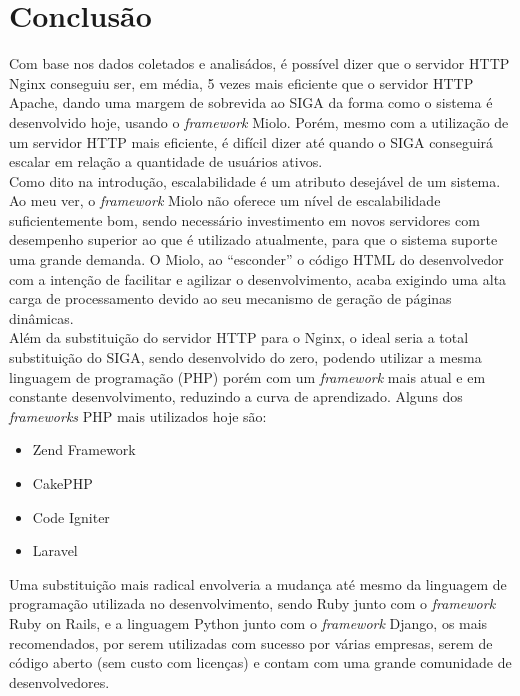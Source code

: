\chapter{Conclusão}\label{cap:conclusao}
Com base nos dados coletados e analisádos, é possível dizer que o servidor HTTP 
Nginx conseguiu ser, em média, 5 vezes mais eficiente que o servidor HTTP 
Apache, dando uma margem de sobrevida ao SIGA da forma como o sistema é 
desenvolvido hoje, usando o \textit{framework} Miolo. Porém, mesmo com a 
utilização de um servidor HTTP mais eficiente, é difícil dizer até quando o 
SIGA conseguirá escalar em relação a quantidade de usuários ativos.\\
Como dito na introdução, escalabilidade é um atributo desejável de um sistema. 
Ao meu ver, o \textit{framework} Miolo não oferece um nível de escalabilidade 
suficientemente bom, sendo necessário investimento em novos servidores com 
desempenho superior ao que é utilizado atualmente, para que o sistema suporte 
uma grande demanda. O Miolo, ao ``esconder'' o código HTML do desenvolvedor com 
a intenção de facilitar e agilizar o desenvolvimento, acaba exigindo uma alta 
carga de processamento devido ao seu mecanismo de geração de páginas 
dinâmicas.\\
Além da substituição do servidor HTTP para o Nginx, o ideal seria a total 
substituição do SIGA, sendo desenvolvido do zero, podendo utilizar a mesma 
linguagem de programação (PHP) porém com um \textit{framework} mais atual e em 
constante desenvolvimento, reduzindo a curva de aprendizado. Alguns dos  
\textit{frameworks} PHP mais utilizados hoje são:
\begin{itemize}
	\item Zend Framework
	\item CakePHP
	\item Code Igniter
	\item Laravel
\end{itemize}
Uma substituição mais radical envolveria a mudança até mesmo da linguagem de 
programação utilizada no desenvolvimento, sendo Ruby junto com o 
\textit{framework} Ruby on Rails, e a linguagem Python junto com o 
\textit{framework} Django, os mais recomendados, por serem utilizadas com 
sucesso por várias empresas, serem de código aberto (sem custo com licenças) e 
contam com uma grande comunidade de desenvolvedores.
